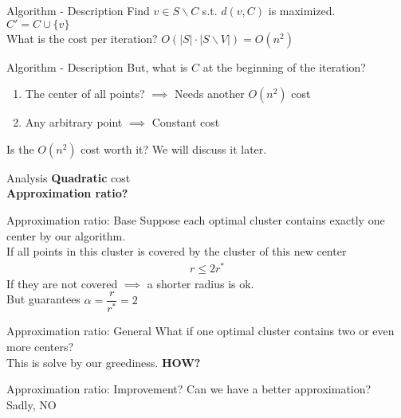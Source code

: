 \documentclass{beamer}
\newcommand*{\brk}{\\[10pt]}
\begin{document}

\begin{frame}{Algorithm - Description}
    Find $v \in S \backslash C$ s.t. $d(v, C)$ is maximized. \brk
    $C' = C \cup \{v\}$ \brk
    \pause
    What is the cost per iteration? \pause $O(|S| \cdot |S \backslash V|) = O(n^2)$
\end{frame}

\begin{frame}{Algorithm - Description}
    But, what is $C$ at the beginning of the iteration? 
    \pause 
    \begin{enumerate}
        \item The center of all points? $\implies$ Needs another $O(n^2)$ cost 
        \item Any arbitrary point $\implies$ Constant cost
    \end{enumerate}
    \pause
    Is the $O(n^2)$ cost worth it? We will discuss it later.
\end{frame}

\begin{frame}{Analysis}
    \textbf{Quadratic} cost
    \pause\brk
    \textbf{Approximation ratio?}
\end{frame}

\begin{frame}{Approximation ratio: Base}
    Suppose each optimal cluster contains exactly one center by our algorithm.\brk
    \pause
    If all points in this cluster is covered by the cluster of this new center
    \begin{align*}
        r \leq 2r^*        
    \end{align*}
    If they are not covered $\implies$ a shorter radius is ok. \brk
    \pause 
    But guarantees $\alpha = \dfrac{r}{r^*} = 2$ 
\end{frame}

\begin{frame}{Approximation ratio: General}
    What if one optimal cluster contains two or even more centers? \brk 
    This is solve by our greediness. \textbf{HOW?}
\end{frame}

\begin{frame}{Approximation ratio: Improvement?}
    Can we have a better approximation? \brk
    Sadly, NO
\end{frame}

\end{document}
